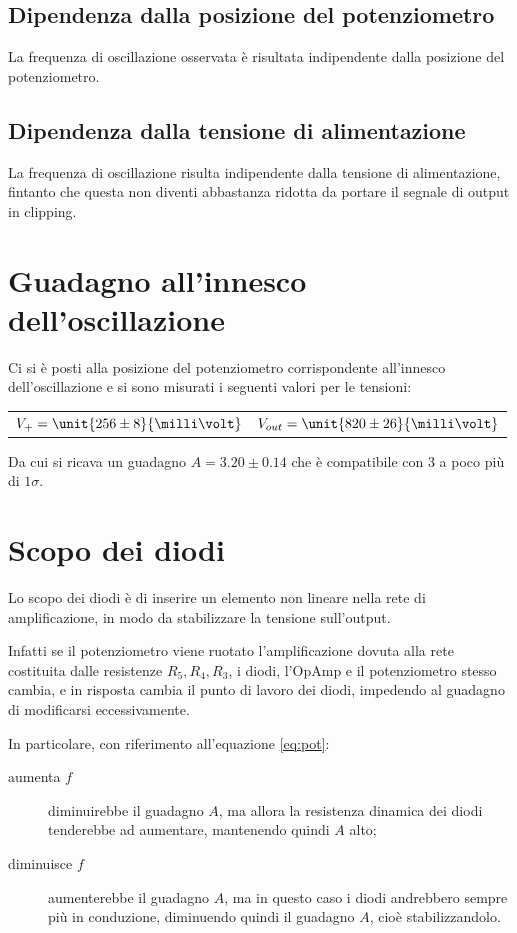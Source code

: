 \documentclass[10pt,a4paper]{article}
\begin{document}
\subsection{Dipendenza dalla posizione del potenziometro}
La frequenza di oscillazione osservata è risultata indipendente dalla posizione del potenziometro.

\subsection{Dipendenza dalla tensione di alimentazione}
La frequenza di oscillazione risulta indipendente dalla tensione di alimentazione, fintanto che questa non diventi abbastanza ridotta da portare il segnale di output in clipping.

\section{Guadagno all'innesco dell'oscillazione}

Ci si è posti alla posizione del potenziometro corrispondente all'innesco dell'oscillazione e si sono misurati i seguenti valori per le tensioni:

\begin{table}[H]
	\centering
	\begin{tabular}{cc}
        $ V_+ = \unit{256 \pm 8}{\milli\volt}$  & $V_{out} = \unit{820 \pm 26}{\milli\volt}$
	\end{tabular}
\end{table}

Da cui si ricava un guadagno $A = 3.20 \pm 0.14$ che è compatibile con 3 a poco più di $1\sigma$.

\section{Scopo dei diodi}
Lo scopo dei diodi è di inserire un elemento non lineare nella rete di amplificazione, in modo da stabilizzare la tensione sull'output.

Infatti se il potenziometro viene ruotato l'amplificazione dovuta alla rete costituita dalle resistenze $R_5, R_4, R_3$, i diodi, l'OpAmp e il potenziometro stesso cambia, e in risposta cambia il punto di lavoro dei diodi, impedendo al guadagno di modificarsi eccessivamente.

In particolare, con riferimento all'equazione \eqref{eq:pot}:
\begin{description}
\item[aumenta $f$] diminuirebbe il guadagno $A$, ma allora la resistenza dinamica dei diodi tenderebbe ad aumentare, mantenendo quindi $A$ alto;
\item[diminuisce $f$] aumenterebbe il guadagno $A$, ma in questo caso i diodi andrebbero sempre più in conduzione, diminuendo quindi il guadagno $A$, cioè stabilizzandolo.
\end{description}
\end{document}

